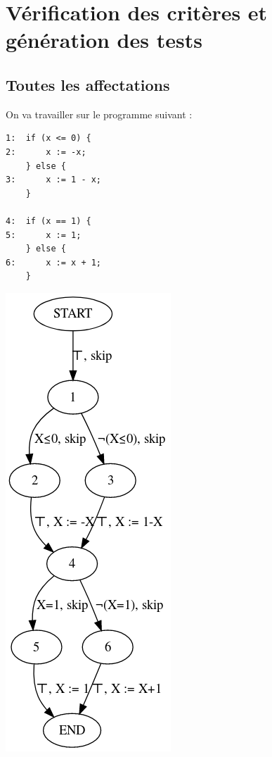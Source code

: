 \documentclass[a4paper, 12pt]{report}
\begin{document}
\chapter{Vérification des critères et génération des tests}

\section{Toutes les affectations}
\label{sec:affectations}
On va travailler sur le programme suivant :

\begin{minipage}{0.46\textwidth}
\begin{verbatim}
1:  if (x <= 0) {
2:      x := -x;
    } else {
3:      x := 1 - x;
    }

4:  if (x == 1) {
5:      x := 1;
    } else {
6:      x := x + 1;
    }
\end{verbatim}
\end{minipage}
\begin{minipage}{0.46\textwidth}
	\includegraphics[scale=0.5]{pics/simpleCFG.png}
\end{minipage}
\end{document}
